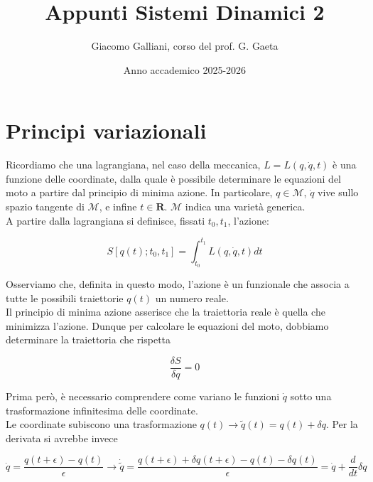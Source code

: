 \documentclass{report}
\title{\Huge{\textbf{Appunti Sistemi Dinamici 2}}}
\author{Giacomo Galliani, corso del prof. G. Gaeta}
\date{Anno accademico 2025-2026}
\renewcommand{\contentsname}{Indice}
\begin{document}
\maketitle
\newpage%
\pdfbookmark[section]{\contentsname}{toc}
\tableofcontents
\pagebreak


\chapter{Principi variazionali}

Ricordiamo che una lagrangiana, nel caso della meccanica, $L = L(q, \dot{q}, t)$ è una funzione delle coordinate, dalla quale è possibile determinare le equazioni del moto a partire dal principio di minima azione. In particolare, $q \in \mathcal{M}$, $\dot{q}$ vive sullo spazio tangente di $\mathcal{M}$, e infine $t \in \mathbf{R}$. $\mathcal{M}$ indica una varietà generica. \\

A partire dalla lagrangiana si definisce, fissati $t_0, t_1$, l'azione: 

\begin{equation}
    S[q(t); t_0, t_1] = \int_{t_0}^{t_1}L(q, \dot{q}, t)dt
\end{equation}

Osserviamo che, definita in questo modo, l'azione è un funzionale che associa a tutte le possibili traiettorie $q(t)$ un numero reale. \\

Il principio di minima azione asserisce che la traiettoria reale è quella che minimizza l'azione. Dunque per calcolare le equazioni del moto, dobbiamo determinare la traiettoria che rispetta 

\begin{equation}
    \frac{\delta S}{\delta q} = 0
\end{equation}

Prima però, è necessario comprendere come variano le funzioni  $\dot{q}$ sotto una trasformazione infinitesima delle coordinate. \\
Le coordinate subiscono una trasformazione $q(t) \rightarrow \tilde{q}(t) = q(t) + \delta q$. Per la derivata si avrebbe invece

\begin{equation}
    \dot{q} = \frac{q(t+\epsilon) - q(t)}{\epsilon} \rightarrow \dot{\tilde{q}} = \frac{q(t+\epsilon) +\delta{q(t+\epsilon)}- q(t) - \delta q(t)}{\epsilon} = \dot{q} + \frac{d}{dt}\delta q
\end{equation}
\end{document}
